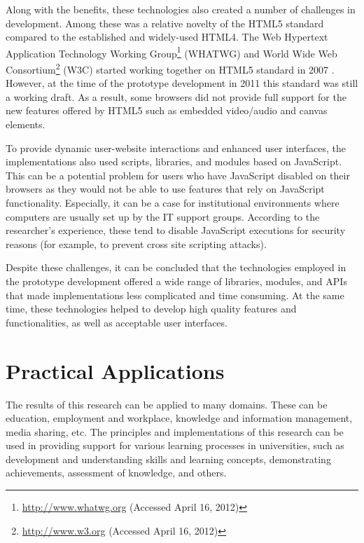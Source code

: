 Along with the benefits, these technologies also created a number of challenges
in development. Among these was a relative novelty of the HTML5 standard
compared to the established and widely-used HTML4. The Web Hypertext Application
Technology Working Group\footnote{\url{http://www.whatwg.org} (Accessed April
16, 2012)} (WHATWG) and World Wide Web Consortium\footnote{\url{http://www.w3.org}  (Accessed April 16,
2012)} (W3C) started working together on HTML5 standard in 2007
\citep{WorldWideWebConsortium2012}. However, at the time of the prototype
development in 2011 this standard was still a working draft. As a result, some
browsers did not provide full support for the new features offered by HTML5 such
as embedded video/audio and canvas elements.

To provide dynamic user-website interactions and enhanced user interfaces, the
implementations also used scripts, libraries, and modules based on
JavaScript. This can be a potential problem for users who have JavaScript
disabled on their browsers as they would not be able to use features that rely
on JavaScript functionality. Especially, it can be a case for institutional
environments where computers are usually set up by the IT support groups.
According to the researcher's experience, these tend to disable JavaScript
executions for security reasons (for example, to prevent cross site scripting
attacks).

Despite these challenges, it can be concluded that the technologies employed in
the prototype development offered a wide range of libraries, modules, and APIs
that made implementations less complicated and time consuming. At the same time,
these technologies helped to develop high quality features and functionalities,
as well as acceptable user interfaces.

\section{Practical Applications}

The results of this research can be applied to many domains. These can be
education, employment and workplace, knowledge and information management, media
sharing, etc. The principles and implementations of this research can be used
in providing support for various learning processes in universities, such as
development and understanding skills and learning concepts, demonstrating
achievements, assessment of knowledge, and others.

